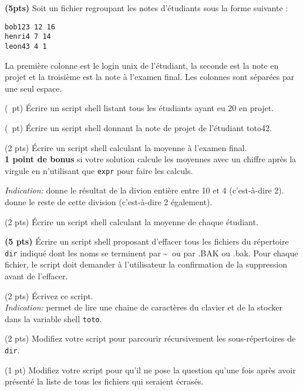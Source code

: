 \documentclass[10pt]{article}
\begin{document}
\begin{Exercice} \textbf{(5pts)}
  Soit un fichier regroupant les notes d'étudiants sous la forme suivante :
  \begin{Verbatim}
bob123 12 16
henri4 7 14
leon43 4 1
  \end{Verbatim}
La première colonne est le login unix de l'étudiant, la seconde est la note en
projet et la troisième est la note à l'examen final. Les colonnes sont séparées
par une seul espace.

\Question (\textonehalf~pt) Écrire un script shell listant tous les étudiants ayant eu 20
en projet.

\Question (\textonehalf~pt) Écrire un script shell donnant la note de projet de l'étudiant
toto42.

\Question (2 pts) Écrire un script shell calculant la moyenne à
l'examen final.\\
\textbf{1 point de bonus} si votre solution calcule les moyennes avec un
chiffre après la virgule en n'utilisant que \texttt{expr} pour faire les
calculs.

\noindent\textit{Indication:}  donne le résultat de la divion entière
entre 10 et 4 (c'est-à-dire 2).  donne le reste de cette
division (c'est-à-dire 2 également).

\Question (2 pts) Écrire un script shell calculant la moyenne de chaque
étudiant.%

\end{Exercice}

\begin{Exercice} \textbf{(5 pts)} Écrire un script shell 
  proposant d'effacer tous les fichiers du répertoire \texttt{dir} indiqué dont
  les noms se terminent par \~~ou par .BAK ou .bak. Pour chaque fichier, le
  script doit demander à l'utilisateur la confirmation de la suppression avant
  de l'effacer.

  \Question (2 pts) Écrivez ce script.\\
\noindent\textit{Indication:}  permet de lire une chaine de
caractères du clavier et de la stocker dans la variable shell \texttt{toto}.

  \begin{Question} (2 pts)
    Modifiez votre script pour parcourir récursivement les sous-répertoires
    de \texttt{dir}.
  \end{Question}

  \begin{Question} (1 pt)
    Modifiez votre script pour qu'il ne pose la question qu'une fois après
    avoir présenté la liste de tous les fichiers qui seraient écrasés.
  \end{Question}

\end{Exercice}
\end{document}
